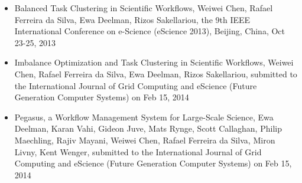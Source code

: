 \begin{itemize}
\item Balanced Task Clustering in Scientific Workflows, Weiwei Chen, Rafael Ferreira da Silva, Ewa Deelman, Rizos Sakellariou, the 9th IEEE International Conference on e-Science (eScience 2013), Beijing, China, Oct 23-25, 2013
\item Imbalance Optimization and Task Clustering in Scientific Workflows, Weiwei Chen, Rafael Ferreira da Silva, Ewa Deelman, Rizos Sakellariou, submitted to the International Journal of Grid Computing and eScience (Future Generation Computer Systems) on Feb 15, 2014
\item Pegasus, a Workflow Management System for Large-Scale Science, Ewa Deelman, Karan Vahi, Gideon Juve, Mats Rynge, Scott Callaghan, Philip Maechling, Rajiv Mayani, Weiwei Chen, Rafael Ferreira da Silva, Miron Livny, Kent Wenger, submitted to the International Journal of Grid Computing and eScience (Future Generation Computer Systems) on Feb 15, 2014
\end{itemize}